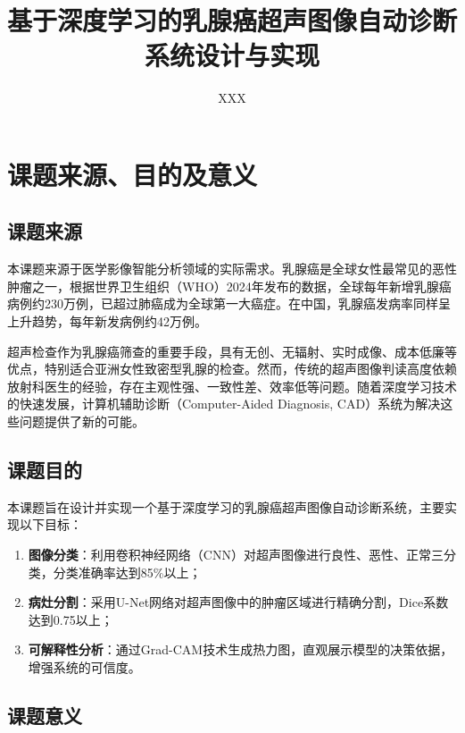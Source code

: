 \documentclass[supercite]{Hust-undergraduate-kaiti}
\title{基于深度学习的乳腺癌超声图像自动诊断系统设计与实现}
\author{XXX}  %
\theoremstyle{definition}
\begin{document}
\maketitle
\clearpage


\section{课题来源、目的及意义}

\subsection{课题来源}

本课题来源于医学影像智能分析领域的实际需求。乳腺癌是全球女性最常见的恶性肿瘤之一，根据世界卫生组织（WHO）2024年发布的数据，全球每年新增乳腺癌病例约230万例，已超过肺癌成为全球第一大癌症。在中国，乳腺癌发病率同样呈上升趋势，每年新发病例约42万例。

超声检查作为乳腺癌筛查的重要手段，具有无创、无辐射、实时成像、成本低廉等优点，特别适合亚洲女性致密型乳腺的检查。然而，传统的超声图像判读高度依赖放射科医生的经验，存在主观性强、一致性差、效率低等问题。随着深度学习技术的快速发展，计算机辅助诊断（Computer-Aided Diagnosis, CAD）系统为解决这些问题提供了新的可能。

\subsection{课题目的}

本课题旨在设计并实现一个基于深度学习的乳腺癌超声图像自动诊断系统，主要实现以下目标：

\begin{enumerate}
    \item \textbf{图像分类}：利用卷积神经网络（CNN）对超声图像进行良性、恶性、正常三分类，分类准确率达到85\%以上；
    \item \textbf{病灶分割}：采用U-Net网络对超声图像中的肿瘤区域进行精确分割，Dice系数达到0.75以上；
    \item \textbf{可解释性分析}：通过Grad-CAM技术生成热力图，直观展示模型的决策依据，增强系统的可信度。
\end{enumerate}

\subsection{课题意义}
\end{document}
